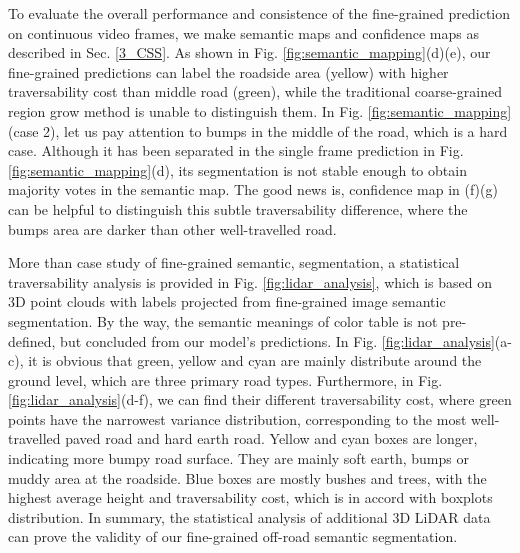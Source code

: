 \documentclass[letterpaper, 10 pt, conference]{ieeeconf}  %
\begin{document}
To evaluate the overall performance and consistence of the fine-grained prediction on continuous video frames, we make semantic maps and confidence maps as described in Sec. \ref{3_CSS}. As shown in Fig. \ref{fig:semantic_mapping}(d)(e), our fine-grained predictions can label the roadside area (yellow) with higher traversability cost than middle road (green), while the traditional coarse-grained region grow method is unable to distinguish them. In Fig. \ref{fig:semantic_mapping}(case 2), let us pay attention to bumps in the middle of the road, which is a hard case. Although it has been separated in the single frame prediction in Fig. \ref{fig:semantic_mapping}(d), its segmentation is not stable enough to obtain majority votes in the semantic map. The good news is, confidence map in (f)(g) can be helpful to distinguish this subtle traversability difference, where the bumps area are darker than other well-travelled road.

More than case study of fine-grained semantic, segmentation, a statistical traversability analysis is provided in Fig. \ref{fig:lidar_analysis}, which is based on 3D point clouds with labels projected from fine-grained image semantic segmentation. By the way, the semantic meanings of color table is not pre-defined, but concluded from our model's predictions.
In Fig. \ref{fig:lidar_analysis}(a-c), it is obvious that green, yellow and cyan are mainly distribute around the ground level, which are three primary road types. Furthermore, in Fig. \ref{fig:lidar_analysis}(d-f), we can find their different traversability cost, where green points have the narrowest variance distribution, corresponding to the most well-travelled paved road and hard earth road. Yellow and cyan boxes are longer, indicating more bumpy road surface. They are mainly soft earth, bumps or muddy area at the roadside. Blue boxes are mostly bushes and trees, with the highest average height and traversability cost, which is in accord with boxplots distribution. In summary, the statistical analysis of additional 3D LiDAR data can prove the validity of our fine-grained off-road semantic segmentation.
\end{document}
